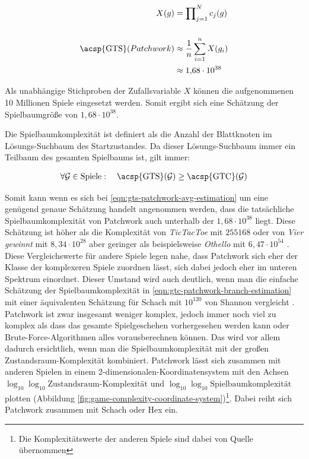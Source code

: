 \begin{equation}
    \label{eqn:gts-patchwork-avg-estimation}
    \begin{aligned}
        X(g)                         & = \prod\nolimits_{j=1}^{N} c_j(g)         \\[15pt]
        \text{\acsp{GTS}}(Patchwork) & \approx \frac{1}{n} \sum_{i=1}^{n} X(g_i) \\[1pt]
                                     & \approx 1{,}68 \cdot 10^{38}
    \end{aligned}
\end{equation}

Als unabhängige Stichproben der Zufallsvariable $X$ können die aufgenommenen 10 Millionen Spiele eingesetzt werden. Somit ergibt sich eine Schätzung der Spielbaumgröße von $1{,}68 \cdot 10^{38}$.

Die Spielbaumkomplexität ist definiert als die Anzahl der Blattknoten im Lösungs-Suchbaum des Startzustandes. Da dieser Lösungs-Suchbaum immer ein Teilbaum des gesamten Spielbaums ist, gilt immer:

\begin{equation}
    \label{eqn:gts-greater-equal-gtc}
    \begin{aligned}
        \forall \mathcal{G} \in \text{Spiele}:\quad \text{\acsp{GTS}}(\mathcal{G}) \geq \text{\acsp{GTC}}(\mathcal{G})
    \end{aligned}
\end{equation}

Somit kann \textendash{} wenn es sich bei \ref{eqn:gts-patchwork-avg-estimation} um eine genügend genaue Schätzung handelt \textendash{} angenommen werden, dass die tatsächliche Spielbaumkomplexität von Patchwork auch unterhalb der $1{,}68 \cdot 10^{38}$ liegt. Diese Schätzung ist höher als die Komplexität von \emph{TicTacToe} mit $255168$ \cite{2024.TicTacToe} oder von \emph{Vier gewinnt} mit $8{,}34 \cdot 10^{28}$ \cite[S. 3]{2019.GameTreeComplexityEstimation} aber geringer als beispielsweise \emph{Othello} mit $6{,}47 \cdot 10^{54}$ \cite[S. 4]{2019.GameTreeComplexityEstimation}. Diese Vergleichswerte für andere Spiele legen nahe, dass Patchwork sich eher der Klasse der komplexeren Spiele zuordnen lässt, sich dabei jedoch eher im unteren Spektrum einordnet. Dieser Umstand wird auch deutlich, wenn man die einfache Schätzung der Spielbaumkomplexität in \ref{eqn:gtc-patchwork-branch-estimation} mit einer äquivalenten Schätzung für Schach mit $10^{120}$ von Shannon vergleicht \cite[S. 4]{1950.ChessShannon}. Patchwork ist zwar insgesamt weniger komplex, jedoch immer noch viel zu komplex als dass das gesamte Spielgeschehen vorhergesehen werden kann oder Brute-Force-Algorithmen alles vorausberechnen können. Das wird vor allem dadurch ersichtlich, wenn man die Spielbaumkomplexität mit der großen Zustandsraum-Komplexität kombiniert. Patchwork lässt sich zusammen mit anderen Spielen in einem 2-dimensionalen-Koordinatensystem mit den Achsen $\log_{10} \log_{10} \text{Zustandsraum-Komplexität}$ und $ \log_{10} \log_{10} \text{Spielbaumkomplexität}$ plotten (Abbildung \ref{fig:game-complexity-coordinate-system})\footnote{Die Komplexitätswerte der anderen Spiele sind dabei von Quelle \cite[S. 300]{2002.GamesSolved} übernommen}. Dabei reiht sich Patchwork zusammen mit Schach oder Hex ein.

